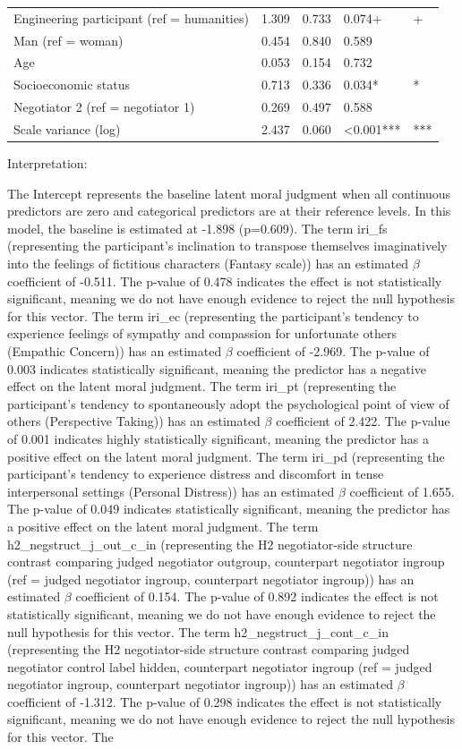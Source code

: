 \documentclass[11pt]{article}
\begin{document}
\begin{table}[H]
{\begin{tabular}{lllll}
Engineering participant (ref = humanities) & 1.309 & 0.733 & 0.074+ & + \\
Man (ref = woman) & 0.454 & 0.840 & 0.589 &  \\
Age & 0.053 & 0.154 & 0.732 &  \\
Socioeconomic status & 0.713 & 0.336 & 0.034* & * \\
Negotiator 2 (ref = negotiator 1) & 0.269 & 0.497 & 0.588 &  \\
Scale variance (log) & 2.437 & 0.060 & <0.001*** & *** \\
\bottomrule
\end{tabular}
}
\end{table}

Interpretation:

The Intercept represents the baseline latent moral judgment when all continuous predictors are zero and categorical predictors are at their reference levels. In this model, the baseline is estimated at -1.898 (p=0.609). The term iri\_fs (representing the participant's inclination to transpose themselves imaginatively into the feelings of fictitious characters (Fantasy scale)) has an estimated $\beta$ coefficient of -0.511. The p-value of 0.478 indicates the effect is not statistically significant, meaning we do not have enough evidence to reject the null hypothesis for this vector. The term iri\_ec (representing the participant's tendency to experience feelings of sympathy and compassion for unfortunate others (Empathic Concern)) has an estimated $\beta$ coefficient of -2.969. The p-value of 0.003 indicates statistically significant, meaning the predictor has a negative effect on the latent moral judgment. The term iri\_pt (representing the participant's tendency to spontaneously adopt the psychological point of view of others (Perspective Taking)) has an estimated $\beta$ coefficient of 2.422. The p-value of 0.001 indicates highly statistically significant, meaning the predictor has a positive effect on the latent moral judgment. The term iri\_pd (representing the participant's tendency to experience distress and discomfort in tense interpersonal settings (Personal Distress)) has an estimated $\beta$ coefficient of 1.655. The p-value of 0.049 indicates statistically significant, meaning the predictor has a positive effect on the latent moral judgment. The term h2\_negstruct\_j\_out\_c\_in (representing the H2 negotiator-side structure contrast comparing judged negotiator outgroup, counterpart negotiator ingroup (ref = judged negotiator ingroup, counterpart negotiator ingroup)) has an estimated $\beta$ coefficient of 0.154. The p-value of 0.892 indicates the effect is not statistically significant, meaning we do not have enough evidence to reject the null hypothesis for this vector. The term h2\_negstruct\_j\_cont\_c\_in (representing the H2 negotiator-side structure contrast comparing judged negotiator control label hidden, counterpart negotiator ingroup (ref = judged negotiator ingroup, counterpart negotiator ingroup)) has an estimated $\beta$ coefficient of -1.312. The p-value of 0.298 indicates the effect is not statistically significant, meaning we do not have enough evidence to reject the null hypothesis for this vector. The 
\end{document}
